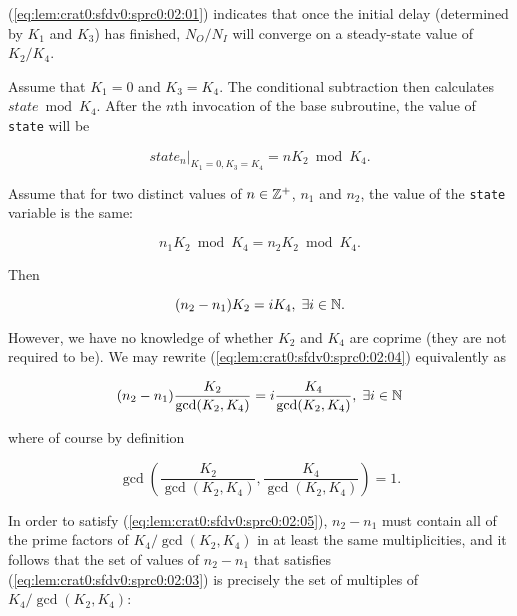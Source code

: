 \begin{vworklemmaproof}
(\ref{eq:lem:crat0:sfdv0:sprc0:02:01}) indicates that once
the initial delay (determined by $K_1$ and $K_3$) has finished, 
$N_O/N_I$ will converge on a steady-state value of
$K_2/K_4$.

Assume that $K_1=0$ and $K_3=K_4$.  The
conditional subtraction then calculates
$state \bmod K_4$.  After the $n$th
invocation of the base subroutine, the value
of \texttt{state} will be

\begin{equation}
\label{eq:lem:crat0:sfdv0:sprc0:02:02}
state_n|_{K_1=0, K_3=K_4} = n K_2 \bmod K_4 .
\end{equation} 

Assume that for two distinct values of
$n \in {\mathbb{Z}^+}$, $n_1$ and $n_2$, 
the value of the \texttt{state} variable is the same:

\begin{equation}
\label{eq:lem:crat0:sfdv0:sprc0:02:03}
n_1 K_2 \bmod K_4 = n_2 K_2 \bmod K_4.
\end{equation} 

Then

\begin{equation}
\label{eq:lem:crat0:sfdv0:sprc0:02:04}
(n_2 - n_1) K_2 = i K_4, \; \exists i \in {\mathbb{N}} .
\end{equation} 

However, we have no knowledge of whether $K_2$ and $K_4$ are
coprime (they are not required to be).  We may rewrite
(\ref{eq:lem:crat0:sfdv0:sprc0:02:04}) equivalently as

\begin{equation}
\label{eq:lem:crat0:sfdv0:sprc0:02:05}
(n_2 - n_1) \frac{K_2}{\gcd(K_2, K_4)} = i \frac{K_4}{\gcd(K_2, K_4)}, 
\; \exists i \in {\mathbb{N}} 
\end{equation} 

where of course by definition

\begin{equation}
\label{eq:lem:crat0:sfdv0:sprc0:02:06}
\gcd \left( { \frac{K_2}{\gcd(K_2, K_4)}, \frac{K_4}{\gcd(K_2, K_4)} } \right) = 1.
\end{equation} 

In order to satisfy (\ref{eq:lem:crat0:sfdv0:sprc0:02:05}),
$n_2 - n_1$ must contain all of the prime factors of 
$K_4/\gcd(K_2,K_4)$ in at least the same multiplicities, 
and it follows that the set of values
of $n_2-n_1$ that satisfies 
(\ref{eq:lem:crat0:sfdv0:sprc0:02:03}) is
precisely the set of multiples of $K_4/\gcd(K_2,K_4)$:


\end{vworklemmaproof}
